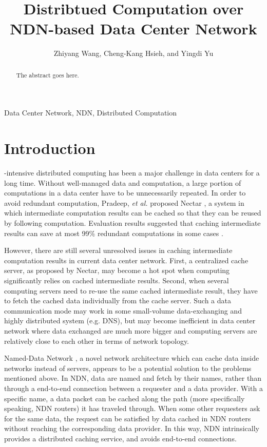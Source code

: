 \documentclass[journal]{IEEEtran}
\begin{document}
\title{Distribtued Computation over NDN-based Data Center Network}

\author{Zhiyang Wang,
        Cheng-Kang Hsieh,
        and Yingdi Yu}

\maketitle

\begin{abstract}
The abstract goes here.
\end{abstract}

\begin{IEEEkeywords}
Data Center Network, NDN, Distributed Computation
\end{IEEEkeywords}

\IEEEpeerreviewmaketitle



\section{Introduction}
-intensive distributed computing has been a major challenge
in data centers for a long time.  Without well-managed data and computation, a
large portion of computations in a data center have to be unnecessarily
repeated.  In order to avoid redundant computation, Pradeep, {\it et al.}
proposed Nectar \cite{gunda2010nectar}, a system in which intermediate computation
results can be cached so that they can be reused by following computation.
Evaluation results suggested that caching intermediate results can save at most
99\% redundant computations in some cases \cite{gunda2010nectar}.

However, there are still several unresolved issues in caching intermediate
computation results in current data center network.  First, a centralized cache
server, as proposed by Nectar, may become a hot spot when computing
significantly relies on cached intermediate results.  Second, when several
computing servers need to re-use the same cached intermediate result, they have
to fetch the cached data individually from the cache server.  Such a data
communication mode may work in some small-volume data-exchanging and highly
distributed system (e.g. DNS), but may become inefficient in data center network
where data exchanged are much more bigger and computing servers are relatively
close to each other in terms of network topology.

Named-Data Network \cite{jacobson2009networking}, a novel network architecture
which can cache data inside networks instead of servers, appears to be a
potential solution to the problems mentioned above.  In NDN, data are named and
fetch by their names, rather than through a end-to-end connection between a
requester and a data provider.  With a specific name, a data packet can be
cached along the path (more specifically speaking, NDN routers) it has traveled
through.  When some other requesters ask for the same data, the request can be
satisfied by data cached in NDN routers without reaching the corresponding data
provider.  In this way, NDN intrinsically provides a distributed caching
service, and avoids end-to-end connections. 
\end{document}
